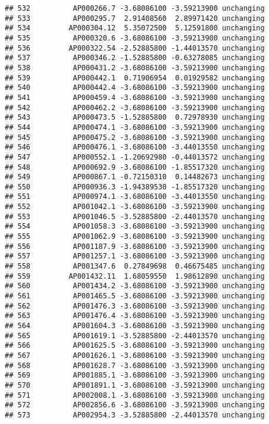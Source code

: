 \documentclass[]{article}
\begin{document}
\begin{verbatim}
## 532          AP000266.7 -3.68086100 -3.59213900 unchanging
## 533          AP000295.7  2.91408560  2.89971420 unchanging
## 534         AP000304.12  5.35072500  5.12591800 unchanging
## 535          AP000320.6 -3.68086100 -3.59213900 unchanging
## 536         AP000322.54 -2.52885800 -1.44013570 unchanging
## 537          AP000346.2 -1.52885800 -0.63278085 unchanging
## 538          AP000431.2 -3.68086100 -3.59213900 unchanging
## 539          AP000442.1  0.71906954  0.01929582 unchanging
## 540          AP000442.4 -3.68086100 -3.59213900 unchanging
## 541          AP000459.4 -3.68086100 -3.59213900 unchanging
## 542          AP000462.2 -3.68086100 -3.59213900 unchanging
## 543          AP000473.5 -1.52885800  0.72978930 unchanging
## 544          AP000474.1 -3.68086100 -3.59213900 unchanging
## 545          AP000475.2 -3.68086100 -3.59213900 unchanging
## 546          AP000476.1 -3.68086100 -3.44013550 unchanging
## 547          AP000552.1 -1.20692980 -0.44013572 unchanging
## 548          AP000692.9 -3.68086100 -1.85517320 unchanging
## 549          AP000867.1 -0.72150310  0.14482673 unchanging
## 550          AP000936.3 -1.94389530 -1.85517320 unchanging
## 551          AP000974.1 -3.68086100 -3.44013550 unchanging
## 552          AP001042.1 -3.68086100 -3.59213900 unchanging
## 553          AP001046.5 -3.52885800 -2.44013570 unchanging
## 554          AP001058.3 -3.68086100 -3.59213900 unchanging
## 555          AP001062.9 -3.68086100 -3.59213900 unchanging
## 556          AP001187.9 -3.68086100 -3.59213900 unchanging
## 557          AP001257.1 -3.68086100 -3.59213900 unchanging
## 558          AP001347.6  0.27849698  0.46675485 unchanging
## 559         AP001432.11  1.68059550  1.98612890 unchanging
## 560          AP001434.2 -3.68086100 -3.59213900 unchanging
## 561          AP001465.5 -3.68086100 -3.59213900 unchanging
## 562          AP001476.3 -3.68086100 -3.59213900 unchanging
## 563          AP001476.4 -3.68086100 -3.59213900 unchanging
## 564          AP001604.3 -3.68086100 -3.59213900 unchanging
## 565          AP001619.1 -3.52885800 -2.44013570 unchanging
## 566          AP001625.5 -3.68086100 -3.59213900 unchanging
## 567          AP001626.1 -3.68086100 -3.59213900 unchanging
## 568          AP001628.7 -3.68086100 -3.59213900 unchanging
## 569          AP001885.1 -3.68086100 -3.59213900 unchanging
## 570          AP001891.1 -3.68086100 -3.59213900 unchanging
## 571          AP002008.1 -3.68086100 -3.59213900 unchanging
## 572          AP002856.6 -3.68086100 -3.59213900 unchanging
## 573          AP002954.3 -3.52885800 -2.44013570 unchanging

\end{verbatim}
\end{document}

